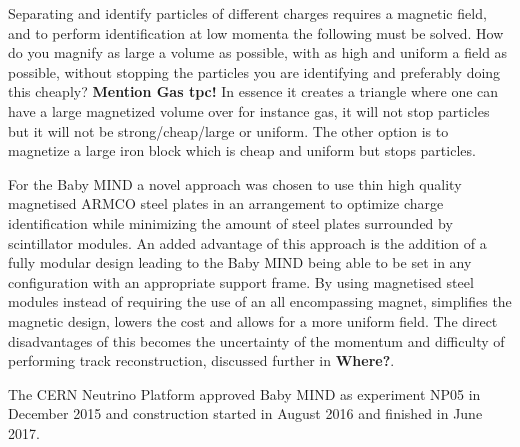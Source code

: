 Separating and identify particles of different charges requires a magnetic field, and to perform identification at low momenta the following must be solved. How do you magnify as large a volume as possible, with as high and uniform a field as possible, without stopping the particles you are identifying and preferably doing this cheaply? \textbf{Mention Gas tpc!} In essence it creates a triangle where one can have a large magnetized volume over for instance gas, it will not stop particles but it will not be strong/cheap/large or uniform. The other option is to magnetize a large iron block which is cheap and uniform but stops particles.

For the Baby MIND a novel approach was chosen to use thin high quality magnetised ARMCO steel plates in an arrangement to optimize charge identification while minimizing the amount of steel plates surrounded by scintillator modules. An added advantage of this approach is the addition of a fully modular design leading to the Baby MIND being able to be set in any configuration with an appropriate support frame. By using magnetised steel modules instead of requiring the use of an all encompassing magnet, simplifies the magnetic design, lowers the cost and allows for a more uniform field. The direct disadvantages of this becomes the uncertainty of the momentum and difficulty of performing track reconstruction, discussed further in \textbf{Where?}.

The CERN Neutrino Platform approved Baby MIND as experiment NP05 in December 2015 and construction started in August 2016 and finished in June 2017. 





